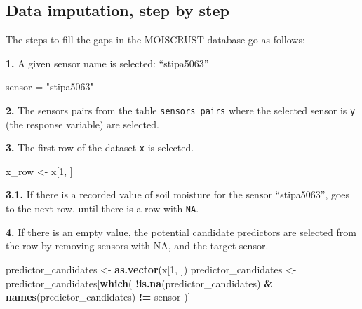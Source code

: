 \documentclass[]{article}
\newenvironment{Shaded}{\begin{snugshade}}{\end{snugshade}}
\newcommand{\DecValTok}[1]{\textcolor[rgb]{0.00,0.00,0.81}{#1}}
\newcommand{\KeywordTok}[1]{\textcolor[rgb]{0.13,0.29,0.53}{\textbf{#1}}}
\newcommand{\NormalTok}[1]{#1}
\newcommand{\OperatorTok}[1]{\textcolor[rgb]{0.81,0.36,0.00}{\textbf{#1}}}
\newcommand{\StringTok}[1]{\textcolor[rgb]{0.31,0.60,0.02}{#1}}
\begin{document}
\hypertarget{data-imputation-step-by-step}{%
\subsection{Data imputation, step by
step}\label{data-imputation-step-by-step}}

The steps to fill the gaps in the MOISCRUST database go as follows:

\textbf{1.} A given sensor name is selected: ``stipa5063''

\begin{Shaded}
\begin{Highlighting}[]
\NormalTok{sensor =}\StringTok{ "stipa5063"}
\end{Highlighting}
\end{Shaded}

\textbf{2.} The sensors pairs from the table \texttt{sensors\_pairs}
where the selected sensor is \texttt{y} (the response variable) are
selected.

\begin{Shaded}
\end{Shaded}

\textbf{3.} The first row of the dataset \texttt{x} is selected.

\begin{Shaded}
\begin{Highlighting}[]
\NormalTok{x_row <-}\StringTok{ }\NormalTok{x[}\DecValTok{1}\NormalTok{, ]}
\end{Highlighting}
\end{Shaded}

\textbf{3.1.} If there is a recorded value of soil moisture for the
sensor ``stipa5063'', goes to the next row, until there is a row with
\texttt{NA}.

\textbf{4.} If there is an empty value, the potential candidate
predictors are selected from the row by removing sensors with NA, and
the target sensor.

\begin{Shaded}
\begin{Highlighting}[]
\NormalTok{predictor_candidates <-}\StringTok{ }\KeywordTok{as.vector}\NormalTok{(x[}\DecValTok{1}\NormalTok{, ])}
\NormalTok{predictor_candidates <-}\StringTok{ }\NormalTok{predictor_candidates[}\KeywordTok{which}\NormalTok{(}
      \OperatorTok{!}\KeywordTok{is.na}\NormalTok{(predictor_candidates) }\OperatorTok{&}\StringTok{ }
\StringTok{        }\KeywordTok{names}\NormalTok{(predictor_candidates) }\OperatorTok{!=}\StringTok{ }\NormalTok{sensor}
\NormalTok{      )]}
\end{Highlighting}
\end{Shaded}
\end{document}
